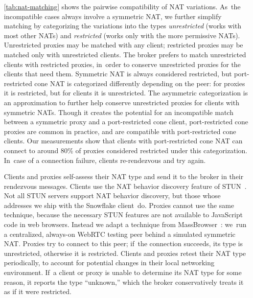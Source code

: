 \documentclass[letterpaper,twocolumn]{article}
\newcommand{\firstterm}[1]{\textit{#1}}
\begin{document}
\autoref{tab:nat-matching}
shows the pairwise compatibility of NAT variations.
As~the incompatible cases always involve a symmetric NAT,
we further simplify matching by categorizing the variations into the types
\firstterm{unrestricted} (works with most other NATs) and
\firstterm{restricted} (works only with the more permissive NATs).
Unrestricted proxies may be matched with any client;
restricted proxies may be matched only with unrestricted clients.
The broker prefers to match unrestricted clients with restricted proxies,
in~order to conserve unrestricted proxies
for the clients that need them.
Symmetric NAT is always considered restricted,
but port-restricted cone NAT is categorized differently
depending on the peer:
for proxies it is restricted, but
for clients it is unrestricted.
The asymmetric categorization is an approximation
to further help conserve unrestricted proxies
for clients with symmetric NATs.
Though it creates the potential for an incompatible match
between a symmetric proxy and a port-restricted cone client,
port-restricted cone proxies are common in practice,
and are compatible with port-restricted cone clients.
Our measurements show that clients with port-restricted cone NAT
can connect to around 80\%
of proxies considered restricted under this categorization.
In~case of a connection failure,
clients re-rendezvous and try again.

Clients and proxies self-assess their NAT type
and send it to the broker in their rendezvous messages.
Clients use the NAT behavior discovery feature of STUN~\cite{rfc5780}.
Not all STUN servers support NAT behavior discovery,
but those whose addresses we ship with the Snowflake client~do.
Proxies cannot use the same technique,
because the necessary STUN features are not available
to JavaScript code in web browsers.
Instead
we adapt a technique from MassBrowser~\cite[\S \mbox{V-A}]{Nasr2020a}:
we~run a centralized, always-on WebRTC testing peer
behind a simulated symmetric NAT.
Proxies try to connect to this peer;
if~the connection succeeds, its type is unrestricted,
otherwise it is restricted.
Clients and proxies retest their NAT type periodically,
to account for potential changes in their local networking environment.
If~a client or proxy is unable to determine its NAT type for some reason,
it reports the type ``unknown,''
which the broker conservatively treats it as if it were restricted.
\end{document}
